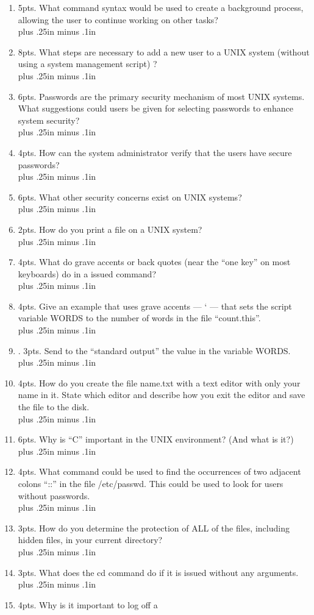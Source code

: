\documentclass[12pt]{article}
\newcommand{\answerA}{\\ \vbox{\vskip 0.35in plus .25in minus .1in}}
\newcommand{\answerB}{\\ \vbox{\vskip 0.50in plus .25in minus .1in}}
\newcommand{\answerC}{\\ \vbox{\vskip 0.75in plus .25in minus .1in}}
\newcommand{\answerD}{\\ \vbox{\vskip 1.00in plus .25in minus .1in}}
\begin{document}
\begin{enumerate}
\answerB
\item  5pts.  What command syntax would be used to create a background process,
              allowing the user to continue working on other tasks?
\answerA
\item  8pts.  What steps are necessary to add a new user to a 
              UNIX system (without using a system management script) ?
\answerD
\item  6pts.  Passwords are the primary security mechanism of 
              most UNIX systems.  What suggestions could users 
              be given for selecting passwords to enhance system security?
\answerC
\item  4pts.  How can the system administrator verify 
              that the users have secure passwords?
\answerC
\item  6pts.  What other security concerns exist on UNIX systems?
\answerC
\item  2pts.   How do you print a file on a UNIX system?
\answerC
\item  4pts.  What do grave accents or back quotes 
              (near the ``one key'' on most keyboards) do in a issued command?
\answerC
\item  4pts.  Give an example that uses grave accents --- ` --- 
              that sets the script variable WORDS to the 
              number of words in the file ``count.this''.
\answerC
\item . 3pts. Send to the ``standard output'' the 
              value in the variable WORDS.
\answerC
\item  4pts.  How do you create the file name.txt with  
              a text editor with only your 
              name in it.  State which editor and describe how you
              exit the editor and save the file to the disk.
\answerC
\item  6pts.  Why is ``C'' important in the UNIX environment? (And what is it?)
\answerC
\item  4pts.  What command could be used to find the 
              occurrences of two adjacent colons ``::'' in 
              the file /etc/passwd.  This could be used to look for users
              without passwords.
\answerC
\item  3pts.  How do you determine the protection of 
              ALL of the files, including hidden files, 
              in your current directory?
\answerA
\item  3pts.  What does the cd command do if it is issued 
              without any arguments.
\answerA
\item  4pts.  Why is it important to log off a 

\end{enumerate}
\end{document}
